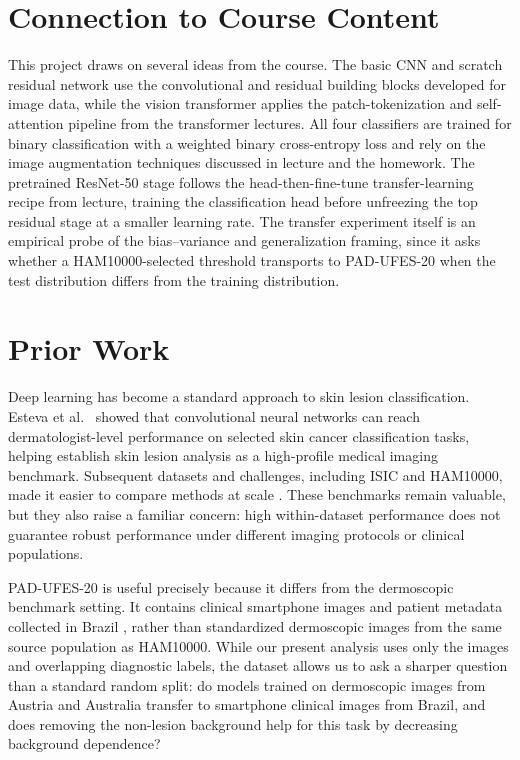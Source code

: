 \documentclass[10pt]{article}
\begin{document}
\section{Connection to Course Content}

This project draws on several ideas from the course. The basic CNN and
scratch residual network use the convolutional and residual building blocks
developed for image data, while the vision transformer applies the
patch-tokenization and self-attention pipeline from the transformer
lectures. All four classifiers are trained for binary classification with a
weighted binary cross-entropy loss and rely on the image augmentation
techniques discussed in lecture and the homework. The pretrained ResNet-50 stage follows the
head-then-fine-tune transfer-learning recipe from lecture, training the
classification head before unfreezing the top residual stage at a smaller
learning rate. The transfer experiment itself is an empirical probe of the
bias--variance and generalization framing, since it asks whether a
HAM10000-selected threshold transports to PAD-UFES-20 when the test
distribution differs from the training distribution.


\section{Prior Work}

Deep learning has become a standard approach to skin lesion classification. Esteva et al.\ \cite{esteva2017dermatologist} showed that convolutional neural networks can reach dermatologist-level performance on selected skin cancer classification tasks, helping establish skin lesion analysis as a high-profile medical imaging benchmark. Subsequent datasets and challenges, including ISIC and HAM10000, made it easier to compare methods at scale \cite{tschandl2018ham10000}. These benchmarks remain valuable, but they also raise a familiar concern: high within-dataset performance does not guarantee robust performance under different imaging protocols or clinical populations.

PAD-UFES-20 is useful precisely because it differs from the dermoscopic benchmark setting. It contains clinical smartphone images and patient metadata collected in Brazil \cite{pacheco2020padufes20}, rather than standardized dermoscopic images from the same source population as HAM10000. While our present analysis uses only the images and overlapping diagnostic labels, the dataset allows us to ask a sharper question than a standard random split: do models trained on dermoscopic images from Austria and Australia transfer to smartphone clinical images from Brazil, and does removing the non-lesion background help for this task by decreasing background dependence?
\end{document}
